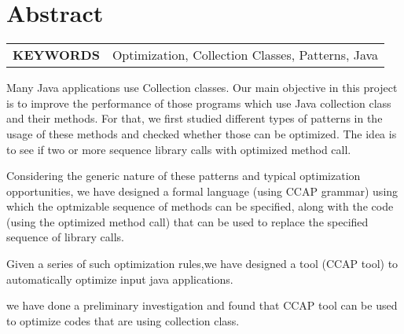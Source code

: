 \chapter{Abstract}
\begin{tabular}{@{} >{\bfseries}p{} p{} @{}}
\MakeUppercase{Keywords} & Optimization, Collection Classes, Patterns, Java
\end{tabular}
\par

\begin{doublespacing}
Many Java applications use Collection classes. Our main objective in this project is to improve the performance of those programs which use Java collection class and their methods. For that, we first studied different types of patterns in the usage of these methods and checked whether those can be optimized. The idea is to see if two or more sequence library calls with optimized method call.

Considering the generic nature of these patterns and typical optimization opportunities, we have designed a formal language (using CCAP grammar) using which the optmizable sequence of methods can be specified, along with the code (using the optimized method call) that can be used to replace the specified sequence of library calls.

Given a series of such optimization rules,we have designed a tool (CCAP tool) to automatically optimize input java applications.

we have done a preliminary investigation and found that CCAP tool can be used to optimize codes that are using collection class.


\end{doublespacing}
